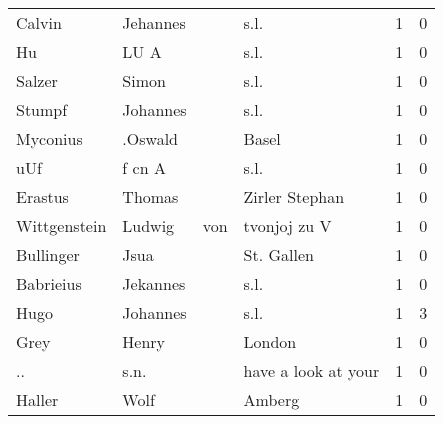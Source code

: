 \begin{center}
\begin{tiny}
\begin{longtabu}{llllrr}
                   Calvin &                           Jehannes &             &                                        s.l. &          1 &         0 \\
                       Hu &                               LU A &             &                                        s.l. &          1 &         0 \\
                   Salzer &                              Simon &             &                                        s.l. &          1 &         0 \\
                   Stumpf &                           Johannes &             &                                        s.l. &          1 &         0 \\
                 Myconius &                            .Oswald &             &                                       Basel &          1 &         0 \\
                      uUf &                             f cn A &             &                                        s.l. &          1 &         0 \\
                  Erastus &                             Thomas &             &                              Zirler Stephan &          1 &         0 \\
             Wittgenstein &                             Ludwig &         von &                                tvonjoj zu V &          1 &         0 \\
                Bullinger &                               Jsua &             &                                  St. Gallen &          1 &         0 \\
                Babrieius &                           Jekannes &             &                                        s.l. &          1 &         0 \\
                     Hugo &                           Johannes &             &                                        s.l. &          1 &         3 \\
                     Grey &                              Henry &             &                                      London &          1 &         0 \\
                       .. &                               s.n. &             &                         have a look at your &          1 &         0 \\
                   Haller &                               Wolf &             &                                      Amberg &          1 &         0 \\

\end{longtabu}
\end{tiny}
\end{center}
